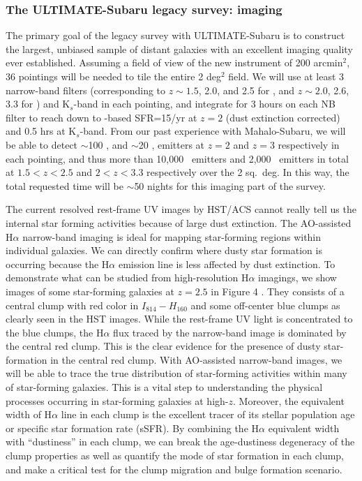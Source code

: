 \subsubsection{The ULTIMATE-Subaru legacy survey: imaging}

The primary goal of the legacy survey with ULTIMATE-Subaru is to construct the
largest, unbiased sample of distant galaxies with an excellent imaging quality
ever established. Assuming a field of view of the new instrument of 200
arcmin$^2$,  36 pointings will be needed to tile the entire 2 deg$^2$
field. We will use at least 3 narrow-band filters (corresponding to
$z\sim1.5$, 2.0, and 2.5 for \ha, and $z\sim2.0$, 2.6, 3.3 for \oiii)
and K$_s$-band in each pointing, and integrate for 3 hours on each NB
filter to reach down to \ha-based SFR=15\msun/yr  
at $z=2$ (dust extinction corrected) and 0.5 hrs at K$_s$-band.
From our past experience with Mahalo-Subaru, we will be able to detect
$\sim$100 \ha, and $\sim$20 \oiii, emitters at $z=2$ and $z=3$ respectively
in each pointing, and thus more than 10,000 \ha\ emitters and 2,000
\oiii\ emitters in total at $1.5<z<2.5$ and $2<z<3.3$ respectively over
the 2 sq.\ deg. In this way, the total requested time will be $\sim$50
nights for this imaging part of the survey.

The current resolved rest-frame UV images by HST/ACS cannot really tell
us the internal star forming activities because of large dust
extinction. The AO-assisted H$\alpha$ narrow-band imaging is ideal for
mapping  star-forming regions within individual galaxies. We can
directly confirm  where dusty star formation is occurring because the
H$\alpha$  emission line is less affected by dust extinction. 
To demonstrate what can be studied from high-resolution H$\alpha$
imagings,  we show images of some star-forming galaxies at $z=2.5$ in
Figure 4 \citep{tadaki14}.
They consists of a central clump with red color in $I_{814}-H_{160}$
and some off-center blue clumps as clearly seen in the HST images.
While the rest-frame UV light is concentrated to the blue clumps, 
the H$\alpha$ flux traced by the narrow-band image is dominated 
by the central red clump. This is the clear evidence for the presence 
of dusty star-formation in the central red clump.  With AO-assisted 
narrow-band images, we will be able to trace the true distribution of 
star-forming activities within many of star-forming galaxies. This is a 
vital step to understanding the physical processes occurring in
star-forming galaxies at high-$z$. Moreover, the equivalent width of
H$\alpha$ line in each clump is the excellent tracer of its stellar
population age or specific star formation rate (sSFR).
By combining the H$\alpha$ equivalent width with ``dustiness'' in each  
clump, we can break the age-dustiness degeneracy of the clump properties  
as well as quantify the mode of star formation in each clump, and make a  
critical test for the clump migration and bulge formation scenario.

